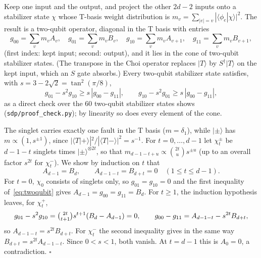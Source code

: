 Keep one input and the output, and project the other $2d-2$ inputs onto a stabilizer state $\chi$ whose T-basis weight distribution is $m_v=\sum_{|e|=v}|\langle\phi_e|\chi\rangle|^2$. The result is a two-qubit operator, diagonal in the T basis with entries
\begin{equation}
 g_{00}=\sum_vm_vA_v,\quad g_{01}=\sum_vm_vB_v,\quad g_{10}=\sum_vm_vA_{v+1},\quad g_{11}=\sum_vm_vB_{v+1},
\end{equation}
(first index: kept input; second: output), and it lies in the cone of two-qubit stabilizer states. (The transpose in the Choi operator replaces $|T\rangle$ by $S^\dagger|T\rangle$ on the kept input, which an $S$ gate absorbs.) Every two-qubit stabilizer state satisfies, with $s=3-2\sqrt2=\tan^2(\pi/8)$,
\begin{equation}
 g_{01}-s^2g_{10}\geq s\,|g_{00}-g_{11}|,\qquad g_{10}-s^2g_{01}\geq s\,|g_{00}-g_{11}|,
 \label{eq:twoqubit}
\end{equation}
as a direct check over the 60 two-qubit stabilizer states shows (\texttt{sdp/proof\_check.py}); by linearity so does every element of the cone.

The singlet carries exactly one fault in the T basis ($m=\delta_1$), while $|{\pm}\rangle$ has $m\propto(1,s^{\pm1})$, since $|\langle T|{+}\rangle|^2/|\langle T|{-}\rangle|^2=s^{-1}$. For $t=0,\dots,d-1$ let $\chi_t^\pm$ be $d-1-t$ singlets times $|{\pm}\rangle^{\otimes2t}$, so that $m_{d-1-t+u}\propto\binom{2t}{u}s^{\pm u}$ (up to an overall factor $s^{2t}$ for $\chi_t^-$). We show by induction on $t$ that
\begin{equation}
 A_{d-1}=B_d,\qquad A_{d-1-t}=B_{d+t}=0\quad(1\leq t\leq d-1).
\end{equation}
For $t=0$, $\chi_0$ consists of singlets only, so $g_{01}=g_{10}=0$ and the first inequality of~\eqref{eq:twoqubit} gives $A_{d-1}=g_{00}=g_{11}=B_d$. For $t\geq1$, the induction hypothesis leaves, for $\chi_t^+$,
\begin{equation}
 g_{01}-s^2g_{10}=\tbinom{2t}{t+1}s^{t+1}(B_d-A_{d-1})=0,\qquad g_{00}-g_{11}=A_{d-1-t}-s^{2t}B_{d+t},
\end{equation}
so $A_{d-1-t}=s^{2t}B_{d+t}$. For $\chi_t^-$ the second inequality gives in the same way $B_{d+t}=s^{2t}A_{d-1-t}$. Since $0<s<1$, both vanish. At $t=d-1$ this is $A_0=0$, a contradiction. $\square$
